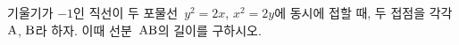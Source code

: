 기울기가 $-1$인 직선이 두 포물선~$y^2=2x$, $x^2=2y$에 동시에 접할 때, 두 접점을 각각 $\mathrm{A}$, $\mathrm{B}$라 하자. 이때 선분~$\mathrm{AB}$의 길이를 구하시오.
